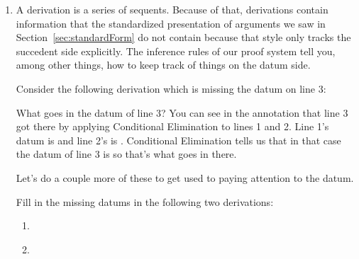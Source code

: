 \begin{enumerate}
 \item A derivation is a series of sequents. Because of that, derivations 
  contain information that the standardized presentation of arguments  we saw in 
  Section~\ref{sec:standardForm} do not contain because that style only tracks 
  the succedent side explicitly. The inference rules of our proof system tell you, 
  among other things, how to keep track of things on the datum side.
 
  Consider the following derivation which is missing the datum on line 3: 


\begin{argument*}




\end{argument*}


  What goes in the datum of line 3? You can see in the annotation that line 3 
  got there by applying Conditional Elimination to lines 1 and 2. Line 1's datum 
  is \p{\Gamma} and line 2's is \p{\Delta}. Conditional Elimination tells us 
  that in that case the datum of line 3 is \p{\Gamma,\Delta} so that's what goes 
  in there. 

  Let's do a couple more of these to get used to paying attention to the datum.

  Fill in the missing datums in the following two derivations:
\begin{enumerate}\setlength{\itemsep}{1.5em}
\item

\begin{argument*}





\end{argument*}

\item

\begin{argument*}


\end{argument*}
\end{enumerate}
\end{enumerate}
